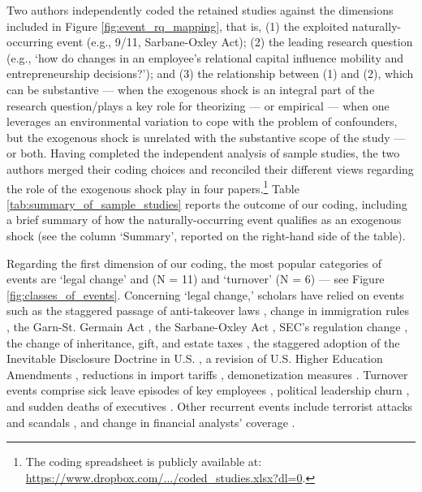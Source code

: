 \begin{refsection}
Two authors independently coded the retained studies against the dimensions 
included in Figure \ref{fig:event_rq_mapping}, that is, (1) the exploited 
naturally-occurring event (e.g., 9/11, Sarbane-Oxley Act); (2) the leading
research question (e.g., `how do changes in an employee's relational capital
influence mobility and entrepreneurship decisions?'); and (3) the relationship
between (1) and (2), which can be substantive --- when the exogenous shock is an
integral part of the research question/plays a key role for theorizing 
--- or empirical --- when one leverages an environmental variation to cope
with the problem of confounders, but the exogenous shock is unrelated with the
substantive scope of the study --- or both. Having completed the independent 
analysis of sample studies, the two authors merged their coding choices and 
reconciled their different views regarding the role of the exogenous shock play
in four papers.\footnote{The coding spreadsheet is publicly available at: \href{
https://www.dropbox.com/s/rzz0kb7hjoe4ec9/coded_studies.csv?dl=0}
{https://www.dropbox.com/.../coded\_studies.xlsx?dl=0}.} Table
\ref{tab:summary_of_sample_studies} reports the outcome of our coding, including
a brief summary of how the naturally-occurring event qualifies as an exogenous
shock (see the column `Summary', reported on the right-hand side of the table).

Regarding the first dimension of our coding, the most popular categories of 
events are `legal change' and (N = 11) and `turnover' (N = 6) --- see Figure 
\ref{fig:classes_of_events}. Concerning `legal change,' scholars have relied on
events such as the staggered passage of anti-takeover laws 
\parencite{cabral202128,wang20162393}, change in immigration rules 
\parencite{choudhury2019203}, the Garn-St. Germain Act
\parencite{haveman2001253}, the Sarbane-Oxley Act \parencite{gupta2020802},
SEC's regulation change \parencite{jia2020290}, the change of inheritance, gift,
and estate taxes \parencite{kang20201300}, the staggered adoption of the
Inevitable Disclosure Doctrine in U.S.  \parencite{kang20201300}, a revision of
U.S. Higher Education Amendments \parencite{krishnan20194522}, reductions in
import tariffs \parencite{li20194011}, demonetization measures
\parencite{natarajan20191070}.  Turnover events comprise sick leave episodes of
key employees \parencite{chen20181239,drexler20142722,chown2015177,}, political
leadership churn \parencite{birhanu2020,byun20191368}, and sudden deaths
of executives \parencite{ke2019439}. Other recurrent events include terrorist
attacks \parencite{corbo2016323,vergne20121027,li20194011} and scandals
\parencite{cai2019159,hilary2021}, and change in financial analysts' coverage
\parencite{chatterji2010917,qian20192271}.


\end{refsection}
